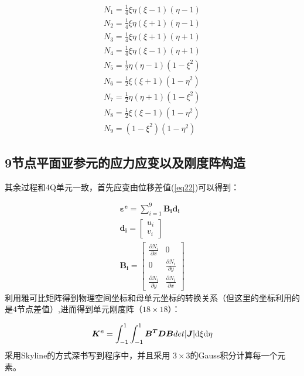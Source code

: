 \documentclass[forprint]{WHUBachelor}
\begin{document}
\begin{equation}
\begin{array}{c}
N_{1}=\frac{1}{4}\xi\eta(\xi-1)(\eta-1)\\
N_{2}=\frac{1}{4}\xi\eta(\xi+1)(\eta-1)\\
N_{3}=\frac{1}{4}\xi\eta(\xi+1)(\eta+1)\\
N_{4}=\frac{1}{4}\xi\eta(\xi-1)(\eta+1)\\
N_{5}=\frac{1}{2}\eta(\eta-1)(1-\xi^{2})\\
N_{6}=\frac{1}{2}\xi(\xi+1)(1-\eta^{2})\\
N_{7}=\frac{1}{2}\eta(\eta+1)(1-\xi^{2})\\
N_{8}=\frac{1}{2}\xi(\xi-1)(1-\eta^{2})\\
N_{9}=(1-\xi^{2})(1-\eta^{2})
\end{array}\label{eq23}
\end{equation}


\subsection{9节点平面亚参元的应力应变以及刚度阵构造}

其余过程和4Q单元一致，首先应变由位移差值(\ref{eq22})可以得到：

\begin{equation}
\begin{array}{c}
\bm{\varepsilon^{e}}=\sum_{i=1}^{9}\bm{B_{i}d_{i}}\\
\bm{d_{i}}=\begin{bmatrix}u_{i}\\
v_{i}
\end{bmatrix}\\
\bm{B_{i}}=\begin{bmatrix}\frac{\partial N_{i}}{\partial x} & 0\\
0 & \frac{\partial N_{i}}{\partial y}\\
\frac{\partial N_{i}}{\partial y} & \frac{\partial N_{i}}{\partial x}
\end{bmatrix}
\end{array}\label{eq24}
\end{equation}
利用雅可比矩阵得到物理空间坐标和母单元坐标的转换关系（但这里的坐标利用的是4节点差值）,进而得到单元刚度阵（$18\times18$）：

\begin{equation}
\bm{K^{e}}=\int_{-1}^{1}\int_{-1}^{1}\bm{B^{T}DB}det|\bm{J}|{\rm d}\xi{\rm d}\eta\label{eq25}
\end{equation}
采用Skyline的方式深书写到程序中，并且采用 $3\times3$的Gauss积分计算每一个元素。
\end{document}
